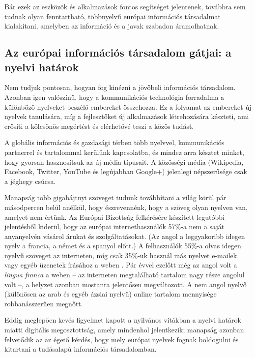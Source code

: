 \begin{multicols}{2}
  Bár ezek az eszközök és alkalmazások fontos segítséget jelentenek, továbbra sem tudnak olyan fenntartható, többnyelvű európai információs társadalmat kialakítani, amelyben az információ és a javak szabadon áramolhatnak.

  \subsection{Az európai információs társadalom gátjai: a nyelvi határok}

  Nem tudjuk pontosan, hogyan fog kinézni a jövőbeli információs társadalom. Azonban igen valószínű, hogy a kommunikációs technológia forradalma a különböző nyelveket beszélő embereket összehozza. Ez a folyamat az embereket új nyelvek tanulására, míg a fejlesztőket új alkalmazások létrehozására készteti, ami erő\-sí\-ti a kölcsönös megértést és elérhetővé teszi a közös tudást. 


  A globális információs és gazdasági térben több nyelvvel, kommunikációs partnerrel és tartalommal kerülünk kapcsolatba, és mindez arra késztet minket, hogy gyorsan hasznosítsuk az új média típusait. A közösségi média (Wikipedia, Facebook, Twitter, YouTube és legújabban Google+) jelenlegi népszerűsége csak a jéghegy csúcsa. 

  Manapság több gigabájtnyi szöveget tu\-dunk továbbítani a világ körül pár másodpercen belül anélkül, hogy észrevennénk, hogy a szöveg olyan nyelven van, amelyet nem értünk. Az Európai Bizottság felkérésére készített legutóbbi jelentésből kiderül, hogy az európai internethasználók 57\%-a nem a saját anyanyelvén vásárol árukat és szolgáltatásokat. (Az angol a leggyakoribb idegen nyelv a francia, a német és a spanyol előtt.) A felhasználók 55\%-a olvas idegen nyelvű szöveget az interneten, míg csak 35\%-uk használ más nyelvet e-mailek vagy egyéb üzenetek írásához a weben \cite{EC1}.  Pár évvel ezelőtt még az angol volt a \textit{lingua franca} a weben -- az interneten megtalálható tartalom nagy része angolul volt --, a helyzet azonban mostanra jelentősen megváltozott. A nem angol nyelvő (különösen az arab és egyéb ázsiai nyelvű) online tartalom mennyisége rob\-ba\-nás\-sze\-rű\-en megnőtt. 

  Eddig meglepően kevés figyelmet kapott a nyilvános vitákban a nyelvi határok miatti digitális megosztottság, amely mindenhol jelentkezik; manapság azonban felvetődik az az égető kérdés, hogy mely európai nyelvek fognak boldogulni és kitartani a tudásalapú információs társadalomban. 


\end{multicols}
